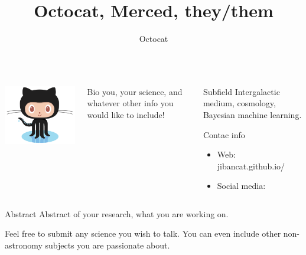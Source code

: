 \documentclass{beamer}
\author[Octocat@ucm.edu]{Octocat}
\title{Octocat, Merced, they/them}
\institute{UC Merced}
\begin{document}
\begin{frame}[fragile]
  \begin{columns}[T]

    \begin{column}{.33\textwidth}
      
      \begin{block}{}
        \begin{center}
          \includegraphics[width=8cm]{images/Octocat.png}
        \end{center}
      \end{block}
    \end{column}

    \begin{column}{.40\textwidth}

      \begin{block}{Bio}
        you, your science, and whatever other info you would like to include!
      \end{block}
    \end{column}

    \begin{column}{.20\textwidth}
      \begin{block}{Subfield}
        Intergalactic medium, cosmology, Bayesian machine learning.
      \end{block}
      \begin{block}{Contac info}    
        \begin{itemize}
          \item Web: jibancat.github.io/
          \item Social media:
        \end{itemize}
      \end{block}
  
  \end{column}

  \end{columns}

  \begin{block}{Abstract}
    Abstract of your research, what you are working on.

    Feel free to submit any science you wish to talk. You can even include other non-astronomy subjects you are passionate about.
  \end{block}


\end{frame}
\end{document}
